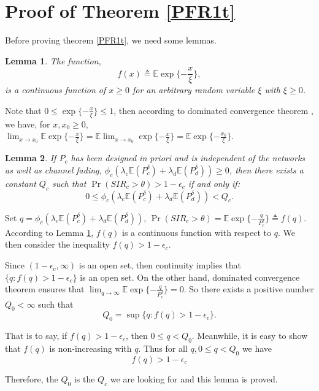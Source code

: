 \documentclass[12pt, draftclsnofoot, journal, letterpaper, onecolumn]{IEEEtran}
\newtheorem{lemma}{Lemma}[section]
\begin{document}
\section{Proof of Theorem \ref{PFR1t}}\label{PFR1proof}
Before proving theorem \ref{PFR1t}, we need some lemmas.
\begin{lemma}\label{continuity}
The function,
\begin{equation*}
f(x)\triangleq\mathbb{E}\exp\{-\frac{x}{\xi}\},
\end{equation*}
is a continuous function of $x\geq0$ for an arbitrary random variable $\xi$ with $\xi\geq0$.
\end{lemma}
\begin{IEEEproof}
Note that $0\leq\exp\{-\frac{x}{\xi}\}\leq 1$, then according to dominated convergence theorem \cite{probability}, we have, for $x,x_0\geq0$, $\lim_{x\to x_0}\mathbb{E}\exp\{-\frac{x}{\xi}\}=\mathbb{E}\lim_{x\to x_0}\exp\{-\frac{x}{\xi}\}=\mathbb{E}\exp\{-\frac{x_0}{\xi}\}$.
\end{IEEEproof}
\begin{lemma}\label{qd}
If $P_c$ has been designed in priori and is independent of the networks as well as channel fading, $\phi_c(\lambda_c\mathbb{E}(P_c^{\delta})+\lambda_d\mathbb{E}(P_d^{\delta}))\geq0$, then there exists a constant $Q_c$ such that $\Pr(SIR_c>\theta)>1-\epsilon_c$ if and only if:
\begin{equation*}
0\leq\phi_c(\lambda_c\mathbb{E}(P_c^{\delta})+\lambda_d\mathbb{E}(P_d^{\delta}))<Q_c.
\end{equation*}
\end{lemma}
\begin{IEEEproof}
Set $q=\phi_c(\lambda_c\mathbb{E}(P_c^{\delta})+\lambda_d\mathbb{E}(P_d^{\delta}))$, $\Pr(SIR_c>\theta)=\mathbb{E}\exp\{-\frac{q}{P_c^\delta}\}\triangleq f(q)$. According to Lemma \ref{continuity}, $f(q)$ is a continuous function with respect to $q$. We then consider the inequality $f(q)>1-\epsilon_c$.

Since $(1-\epsilon_c,\infty)$ is an open set, then continuity implies that $\{q:f(q)>1-\epsilon_c\}$ is an open set. On the other hand, dominated convergence theorem ensures that $\lim_{q\to \infty}\mathbb{E}\exp\{-\frac{q}{P_c^\delta}\}=0$. So there exists a positive number $Q_0<\infty$ such that
\begin{equation*}
Q_0=\sup\{q:f(q)>1-\epsilon_c\}.
\end{equation*}

That is to say, if $f(q)>1-\epsilon_c$, then $0\leq q<Q_0$.
Meanwhile, it is easy to show that $f(q)$ is non-increasing with $q$. Thus for all $q,0\leq q<Q_0$ we have
\begin{equation*}
f(q)>1-\epsilon_c
\end{equation*}

Therefore, the $Q_0$ is the $Q_c$ we are looking for and this lemma is proved.
\end{IEEEproof}
\end{document}
